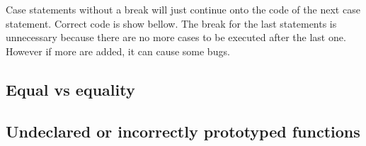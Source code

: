 Case statements without a break will just continue onto the code of the
next case statement. Correct code is show bellow. The break for the last
statements is unnecessary because there are no more cases to be executed
after the last one. However if more are added, it can cause some bugs.

\begin{Shaded}
\begin{Highlighting}[]
 \NormalTok{; }
   \NormalTok{: }
    \NormalTok{);}
    \NormalTok{;}
   \NormalTok{: }
    \NormalTok{);}
    \NormalTok{;}
   \NormalTok{: }
    \NormalTok{);}
    \NormalTok{; }
\NormalTok{\}}
\end{Highlighting}
\end{Shaded}

\subsection{Equal vs equality}\label{equal-vs-equality}

\begin{Shaded}
\end{Shaded}

\subsection{Undeclared or incorrectly prototyped
functions}\label{undeclared-or-incorrectly-prototyped-functions}

\begin{Shaded}
\begin{Highlighting}[]
\end{Highlighting}
\end{Shaded}

